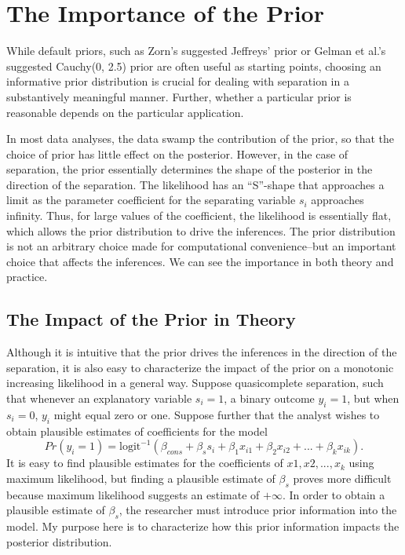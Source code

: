 \documentclass[12pt]{article}
\begin{document}
\section*{The Importance of the Prior}

While default priors, such as Zorn's suggested Jeffreys' prior or Gelman et al.'s suggested Cauchy(0, 2.5) prior are often useful as starting points, choosing an informative prior distribution is crucial for dealing with separation in a substantively meaningful manner. 
Further, whether a particular prior is reasonable depends on the particular application.

In most data analyses, the data swamp the contribution of the prior, so that the choice of prior has little effect on the posterior. 
However, in the case of separation, the prior essentially determines the shape of the posterior in the direction of the separation. 
The likelihood has an ``S''-shape that approaches a limit as the parameter coefficient for the separating variable $s_i$ approaches infinity. 
Thus, for large values of the coefficient, the likelihood is essentially flat, which allows the prior distribution to drive the inferences. 
The prior distribution is not an arbitrary choice made for computational convenience--but an important choice that affects the inferences. 
We can see the importance in both theory and practice.

\subsection*{The Impact of the Prior in Theory}

Although it is intuitive that the prior drives the inferences in the direction of the separation, it is also easy to characterize the impact of the prior on a monotonic increasing likelihood in a general way. 
Suppose quasicomplete separation, such that whenever an explanatory variable $s_i = 1$, a binary outcome $y_i = 1$, but when $s_i = 0$, $y_i$ might equal zero or one. 
Suppose further that the analyst wishes to obtain plausible estimates of coefficients for the model
\begin{equation*}
Pr(y_i =1) = \text{logit}^{-1}(\beta_{cons} + \beta_s s_i +  \beta_1 x_{i1} + \beta_2 x_{i2} + ... + \beta_k x_{ik}). 
\end{equation*}
\noindent It is easy to find plausible estimates for the coefficients of $x1, x2, ..., x_k$ using maximum likelihood, but finding a plausible estimate of $\beta_{s}$ proves more difficult because maximum likelihood suggests an estimate of $+\infty$. 
In order to obtain a plausible estimate of $\beta_{s}$, the researcher must introduce prior information into the model. 
My purpose here is to characterize how this prior information impacts the posterior distribution.
\end{document}

